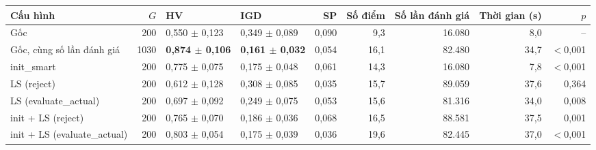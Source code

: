 \begin{tabular}{@{}lrllrrrrr@{}}
\toprule
Cấu hình & $G$ & HV & IGD & SP & Số điểm & Số lần đánh giá & Thời gian (s) & $p$ \\
\midrule
Gốc & 200 & 0{,}550 $\pm$ 0{,}123 & 0{,}349 $\pm$ 0{,}089 & 0{,}090 & 9{,}3 & 16.080 & 8{,}0 & -- \\
Gốc, cùng số lần đánh giá & 1030 & \textbf{0{,}874 $\pm$ 0{,}106} & \textbf{0{,}161 $\pm$ 0{,}032} & 0{,}054 & 16{,}1 & 82.480 & 34{,}7 & $<$0{,}001 \\
init\_smart & 200 & 0{,}775 $\pm$ 0{,}075 & 0{,}175 $\pm$ 0{,}048 & 0{,}061 & 14{,}3 & 16.080 & 7{,}8 & $<$0{,}001 \\
LS (reject) & 200 & 0{,}612 $\pm$ 0{,}128 & 0{,}308 $\pm$ 0{,}085 & 0{,}035 & 15{,}7 & 89.059 & 37{,}6 & 0{,}364 \\
LS (evaluate\_actual) & 200 & 0{,}697 $\pm$ 0{,}092 & 0{,}249 $\pm$ 0{,}075 & 0{,}053 & 15{,}6 & 81.316 & 34{,}0 & 0{,}008 \\
init + LS (reject) & 200 & 0{,}765 $\pm$ 0{,}070 & 0{,}186 $\pm$ 0{,}036 & 0{,}068 & 16{,}5 & 88.581 & 37{,}5 & 0{,}001 \\
init + LS (evaluate\_actual) & 200 & 0{,}803 $\pm$ 0{,}054 & 0{,}175 $\pm$ 0{,}039 & 0{,}036 & 19{,}6 & 82.445 & 37{,}0 & $<$0{,}001 \\
\bottomrule
\end{tabular}
